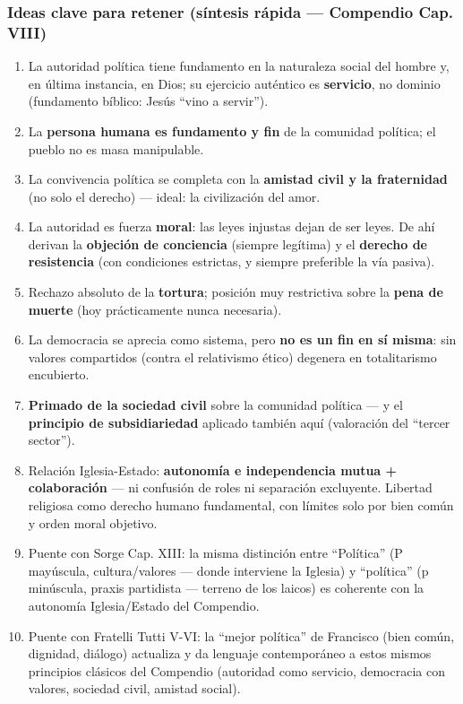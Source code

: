 \documentclass[10pt,a4paper]{article}
\begin{document}
\subsubsection{Ideas clave para retener (síntesis rápida --- Compendio Cap. VIII)}
\begin{enumerate}
\item La autoridad política tiene fundamento en la naturaleza social del hombre y, en última instancia, en Dios; su ejercicio auténtico es \textbf{servicio}, no dominio (fundamento bíblico: Jesús ``vino a servir'').
\item La \textbf{persona humana es fundamento y fin} de la comunidad política; el pueblo no es masa manipulable.
\item La convivencia política se completa con la \textbf{amistad civil y la fraternidad} (no solo el derecho) --- ideal: la civilización del amor.
\item La autoridad es fuerza \textbf{moral}: las leyes injustas dejan de ser leyes. De ahí derivan la \textbf{objeción de conciencia} (siempre legítima) y el \textbf{derecho de resistencia} (con condiciones estrictas, y siempre preferible la vía pasiva).
\item Rechazo absoluto de la \textbf{tortura}; posición muy restrictiva sobre la \textbf{pena de muerte} (hoy prácticamente nunca necesaria).
\item La democracia se aprecia como sistema, pero \textbf{no es un fin en sí misma}: sin valores compartidos (contra el relativismo ético) degenera en totalitarismo encubierto.
\item \textbf{Primado de la sociedad civil} sobre la comunidad política --- y el \textbf{principio de subsidiariedad} aplicado también aquí (valoración del ``tercer sector'').
\item Relación Iglesia-Estado: \textbf{autonomía e independencia mutua + colaboración} --- ni confusión de roles ni separación excluyente. Libertad religiosa como derecho humano fundamental, con límites solo por bien común y orden moral objetivo.
\item Puente con Sorge Cap. XIII: la misma distinción entre ``Política'' (P mayúscula, cultura/valores --- donde interviene la Iglesia) y ``política'' (p minúscula, praxis partidista --- terreno de los laicos) es coherente con la autonomía Iglesia/Estado del Compendio.
\item Puente con Fratelli Tutti V-VI: la ``mejor política'' de Francisco (bien común, dignidad, diálogo) actualiza y da lenguaje contemporáneo a estos mismos principios clásicos del Compendio (autoridad como servicio, democracia con valores, sociedad civil, amistad social).
\end{enumerate}
\end{document}
